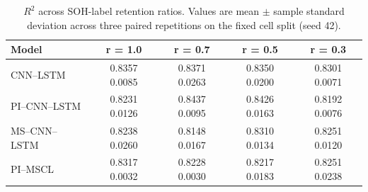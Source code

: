 \begin{table}[htbp]
\caption{$R^2$ across SOH-label retention ratios. Values are mean $\pm$ sample standard deviation across three paired repetitions on the fixed cell split (seed 42).}
\label{tab:label_budget_r2}
\centering
\setlength{\tabcolsep}{3.5pt}
\begin{tabular*}{\textwidth}{@{\extracolsep{\fill}}lcccc@{}}
\toprule
Model & r = 1.0 & r = 0.7 & r = 0.5 & r = 0.3 \\
\midrule
CNN--LSTM & 0.8357 \textpm{} 0.0085 & 0.8371 \textpm{} 0.0263 & 0.8350 \textpm{} 0.0200 & 0.8301 \textpm{} 0.0071 \\
PI--CNN--LSTM & 0.8231 \textpm{} 0.0126 & 0.8437 \textpm{} 0.0095 & 0.8426 \textpm{} 0.0163 & 0.8192 \textpm{} 0.0076 \\
MS--CNN--LSTM & 0.8238 \textpm{} 0.0260 & 0.8148 \textpm{} 0.0167 & 0.8310 \textpm{} 0.0134 & 0.8251 \textpm{} 0.0120 \\
PI--MSCL & 0.8317 \textpm{} 0.0032 & 0.8228 \textpm{} 0.0030 & 0.8217 \textpm{} 0.0183 & 0.8251 \textpm{} 0.0238 \\
\bottomrule
\end{tabular*}
\end{table}
